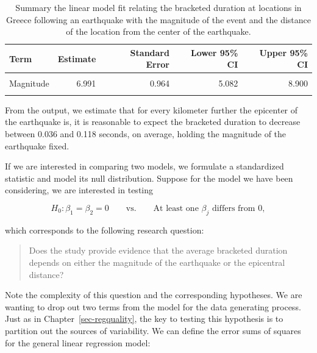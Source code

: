 \documentclass[
  letterpaper,
  DIV=11,
  numbers=noendperiod]{scrreprt}
\theoremstyle{plain}
\theoremstyle{definition}
\theoremstyle{definition}
\theoremstyle{remark}
\begin{document}
\hypertarget{tbl-regextensions-ci}{}
\begin{table}
\caption{\label{tbl-regextensions-ci}Summary the linear model fit relating the bracketed duration at
locations in Greece following an earthquake with the magnitude of the
event and the distance of the location from the center of the
earthquake. }\tabularnewline

\centering
\begin{tabular}[t]{lrrrr}
\toprule
Term & Estimate & Standard Error & Lower 95\% CI & Upper 95\% CI\\
\midrule
\cellcolor{gray!6}{(Intercept)} & \cellcolor{gray!6}{-30.715} & \cellcolor{gray!6}{4.887} & \cellcolor{gray!6}{-40.395} & \cellcolor{gray!6}{-21.036}\\
Magnitude & 6.991 & 0.964 & 5.082 & 8.900\\
\cellcolor{gray!6}{Epicentral Distance} & \cellcolor{gray!6}{-0.077} & \cellcolor{gray!6}{0.021} & \cellcolor{gray!6}{-0.118} & \cellcolor{gray!6}{-0.036}\\
\bottomrule
\end{tabular}
\end{table}

From the output, we estimate that for every kilometer further the
epicenter of the earthquake is, it is reasonable to expect the bracketed
duration to decrease between 0.036 and 0.118 seconds, on average,
holding the magnitude of the earthquake fixed.

If we are interested in comparing two models, we formulate a
standardized statistic and model its null distribution. Suppose for the
model we have been considering, we are interested in testing

\[H_0: \beta_1 = \beta_2 = 0 \qquad \text{vs.} \qquad \text{At least one } \beta_j \text{ differs from 0},\]

which corresponds to the following research question:

\begin{quote}
Does the study provide evidence that the average bracketed duration
depends on either the magnitude of the earthquake or the epicentral
distance?
\end{quote}

Note the complexity of this question and the corresponding hypotheses.
We are wanting to drop out two terms from the model for the data
generating process. Just as in Chapter~\ref{sec-regquality}, the key to
testing this hypothesis is to partition out the sources of variability.
We can define the error sums of squares for the general linear
regression model:
\end{document}
